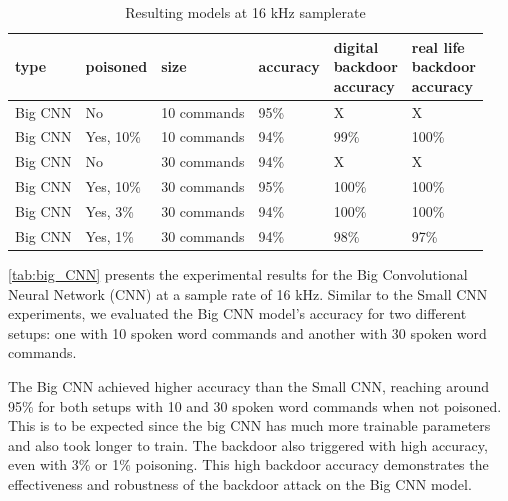 \documentclass{report}
\theoremstyle{definition}
\theoremstyle{remark}
\begin{document}
\begin{table}[!hbt]
\centering
\begin{tabular}{|l|l|l|l|l|l|}
\hline
type & poisoned & size & accuracy &  \thead{digital \\ backdoor \\ accuracy} & \thead{real life \\ backdoor \\ accuracy} \\ \hline
Big CNN & No  &  10 commands  &  95\% & X & X\\ \hline
Big CNN & Yes, 10\%  &  10 commands  & 94\% & 99\%  & 100\% \\ \hline
Big CNN & No  &  30 commands  &   94\%  & X & X    \\ \hline
Big CNN & Yes, 10\%  &  30 commands  &  95\% & 100\% &  100\%     \\ \hline
Big CNN & Yes, 3\%  &  30 commands  &  94\%  & 100\% &  100\%  \\ \hline
Big CNN & Yes, 1\%  &  30 commands  &  94\%  & 98\%  &  97\% \\ \hline
\end{tabular}
\caption{Resulting models at 16 kHz samplerate}
\label{tab:big_CNN}
\end{table}

\autoref{tab:big_CNN} presents the experimental results for the Big Convolutional Neural Network (CNN) at a sample rate of 16 kHz. Similar to the Small CNN experiments, we evaluated the Big CNN model's accuracy for two different setups: one with 10 spoken word commands and another with 30 spoken word commands. 

The Big CNN achieved higher accuracy than the Small CNN, reaching around 95\% for both setups with 10 and 30 spoken word commands when not poisoned. This is to be expected since the big CNN has much more trainable parameters and also took longer to train. The backdoor also triggered with high accuracy, even with 3\% or 1\% poisoning. This high backdoor accuracy demonstrates the effectiveness and robustness of the backdoor attack on the Big CNN model.
\end{document}
